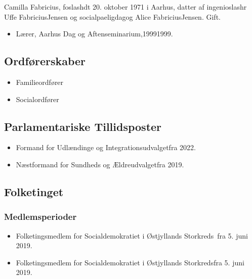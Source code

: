 \documentclass[11pt, a4paper]{awesome-cv}
\begin{document}
\makecvheader[R]
\makelettertitle
\begin{cvletter}
Camilla Fabricius, foslashdt 20. oktober 1971 i Aarhus, datter af ingenioslashr Uffe FabriciusJensen og socialpaeligdagog Alice FabriciusJensen. Gift.

\begin{itemize}
\item Lærer, Aarhus Dag og Aftenseminarium,19991999.
\end{itemize}
\subsection*{Ordførerskaber}
\begin{itemize}
\item Familieordfører
\item Socialordfører
\end{itemize}
\subsection*{Parlamentariske Tillidsposter}
\begin{itemize}
\item Formand for Udlændinge og Integrationsudvalgetfra 2022.
\item Næstformand for Sundheds og Ældreudvalgetfra 2019.
\end{itemize}
\subsection*{Folketinget}
\subsubsection*{Medlemsperioder}
\begin{itemize}
\item Folketingsmedlem for Socialdemokratiet i Østjyllands Storkreds fra 5. juni 2019.
\item Folketingsmedlem for Socialdemokratiet i Østjyllands Storkredsfra 5. juni 2019.
\end{itemize}

\end{cvletter}
\end{document}
